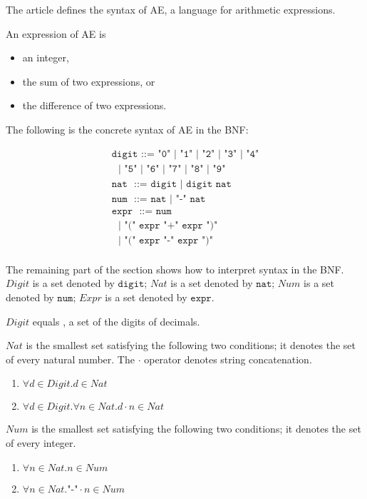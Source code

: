 The article defines the syntax of AE, a language for arithmetic expressions.

An expression of AE is

\begin{itemize}
\item an integer,
\item the sum of two expressions, or
\item the difference of two expressions.
\end{itemize}

The following is the concrete syntax of AE in the BNF:

\[
\begin{array}{l}
\texttt{digit ::= "0" | "1" | "2" | "3" | "4"} \\
\texttt{\ \ \ \ \ \ \ \ }\texttt{| "5" | "6" | "7" | "8" | "9"} \\
\texttt{nat}\texttt{\ \ \ }\texttt{::= digit | digit nat} \\
\texttt{num}\texttt{\ \ \ }\texttt{::= nat | "-" nat} \\
\texttt{expr}\texttt{\ \ }\texttt{::= num} \\
\texttt{\ \ \ \ \ \ \ \ }\texttt{| "(" expr "+" expr ")"} \\
\texttt{\ \ \ \ \ \ \ \ }\texttt{| "(" expr "-" expr ")"} \\
\end{array}
\]

The remaining part of the section shows how to interpret syntax in the BNF.
\(Digit\) is a set denoted by \(\texttt{digit}\); \(Nat\) is a set denoted by \(\texttt{
nat}\); \(Num\) is a set denoted by \(\texttt{num}\); \(Expr\) is a set denoted by
\(\texttt{expr}\).

\(Digit\) equals , a set of the digits of decimals.

\(Nat\) is the smallest set satisfying the following two conditions; it denotes
the set of every natural number. The \(\cdot\) operator denotes string
concatenation.

\begin{enumerate}
\item \(\forall d\in Digit.d\in Nat\)
\item \(\forall d\in Digit.\forall n\in Nat.d \cdot n\in Nat\)
\end{enumerate}

\(Num\) is the smallest set satisfying the following two conditions; it denotes
the set of every integer.

\begin{enumerate}
\item \(\forall n\in Nat.n\in Num\)
\item \(\forall n\in Nat.\texttt{"-"}\cdot n\in Num\)
\end{enumerate}

